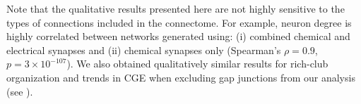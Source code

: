 \documentclass[10pt,letterpaper]{article}
\begin{document}
Note that the qualitative results presented here are not highly sensitive to the
\color{teal}
types of connections included in the connectome.
For example, neuron degree is highly correlated between networks generated using: (i) combined chemical and electrical synapses and (ii) chemical synapses only (Spearman's $\rho= 0.9$, $p = 3 \times 10^{-107}$).
We also obtained qualitatively similar results for rich-club organization and trends in CGE when excluding gap junctions from our analysis (see ).
\color{black}
\end{document}
